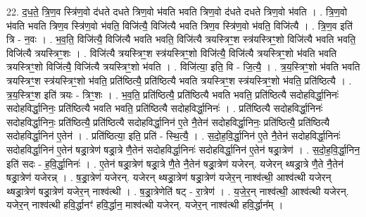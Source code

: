 \documentclass[17pt]{extarticle}
\begin{document}
22. द॒ध॒ते॒ त्रि॒ण॒व स्त्रि॑ण॒वो द॑धते दधते त्रिण॒वो भ॑वति भवति त्रिण॒वो द॑धते दधते त्रिण॒वो भ॑वति । . त्रि॒ण॒वो भ॑वति भवति त्रिण॒व स्त्रि॑ण॒वो भ॑वति॒ विजि॑त्यै॒ विजि॑त्यै भवति त्रिण॒व स्त्रि॑ण॒वो भ॑वति॒ विजि॑त्यै । . त्रि॒ण॒व इति॑ त्रि - न॒वः । . भ॒व॒ति॒ विजि॑त्यै॒ विजि॑त्यै भवति भवति॒ विजि॑त्यै त्रयस्त्रिꣳ॒॒श स्त्र॑यस्त्रिꣳ॒॒शो विजि॑त्यै भवति भवति॒ विजि॑त्यै त्रयस्त्रिꣳ॒॒शः । . विजि॑त्यै त्रयस्त्रिꣳ॒॒श स्त्र॑यस्त्रिꣳ॒॒शो विजि॑त्यै॒ विजि॑त्यै त्रयस्त्रिꣳ॒॒शो भ॑वति भवति त्रयस्त्रिꣳ॒॒शो विजि॑त्यै॒ विजि॑त्यै त्रयस्त्रिꣳ॒॒शो भ॑वति । . विजि॑त्या॒ इति॒ वि - जि॒त्यै॒ । . त्र॒य॒स्त्रिꣳ॒॒शो भ॑वति भवति त्रयस्त्रिꣳ॒॒श स्त्र॑यस्त्रिꣳ॒॒शो भ॑वति॒ प्रति॑ष्ठित्यै॒ प्रति॑ष्ठित्यै भवति त्रयस्त्रिꣳ॒॒श स्त्र॑यस्त्रिꣳ॒॒शो भ॑वति॒ प्रति॑ष्ठित्यै । . त्र॒य॒स्त्रिꣳ॒॒श इति॑ त्रयः - त्रिꣳ॒॒शः । . भ॒व॒ति॒ प्रति॑ष्ठित्यै॒ प्रति॑ष्ठित्यै भवति भवति॒ प्रति॑ष्ठित्यै सदोहविर्द्धा॒निनः॑ सदोहविर्द्धा॒निनः॒ प्रति॑ष्ठित्यै भवति भवति॒ प्रति॑ष्ठित्यै सदोहविर्द्धा॒निनः॑ । . प्रति॑ष्ठित्यै सदोहविर्द्धा॒निनः॑ सदोहविर्द्धा॒निनः॒ प्रति॑ष्ठित्यै॒ प्रति॑ष्ठित्यै सदोहविर्द्धा॒निन॑ 
ए॒ते नै॒तेन॑ सदोहविर्द्धा॒निनः॒ प्रति॑ष्ठित्यै॒ प्रति॑ष्ठित्यै सदोहविर्द्धा॒निन॑ ए॒तेन॑ । . प्रति॑ष्ठित्या॒ इति॒ प्रति॑ - स्थि॒त्यै॒ । . स॒दो॒ह॒वि॒र्द्धा॒निन॑ ए॒ते नै॒तेन॑ सदोहविर्द्धा॒निनः॑ सदोहविर्द्धा॒निन॑ ए॒तेन॑ षड्रा॒त्रेण॑ षड्रा॒त्रे णै॒तेन॑ सदोहविर्द्धा॒निनः॑ सदोहविर्द्धा॒निन॑ ए॒तेन॑ षड्रा॒त्रेण॑ । . स॒दो॒ह॒वि॒र्द्धा॒निन॒ इति॑ सदः - ह॒वि॒र्द्धा॒निनः॑ । . ए॒तेन॑ षड्रा॒त्रेण॑ षड्रा॒त्रे णै॒ते नै॒तेन॑ षड्रा॒त्रेण॑ यजेरन्. यजेरन् थ्षड्रा॒त्रे णै॒ते नै॒तेन॑ षड्रा॒त्रेण॑ यजेरन्न् । . ष॒ड्रा॒त्रेण॑ यजेरन्. यजेरन् थ्षड्रा॒त्रेण॑ षड्रा॒त्रेण॑ यजेर॒न् नाश्व॑त्थी॒ आश्व॑त्थी यजेरन् थ्षड्रा॒त्रेण॑ षड्रा॒त्रेण॑ यजेर॒न् नाश्व॑त्थी । . ष॒ड्रा॒त्रेणेति॑ षट् - रा॒त्रेण॑ । . य॒जे॒र॒न् नाश्व॑त्थी॒ आश्व॑त्थी यजेरन्. यजेर॒न् नाश्व॑त्थी हवि॒र्द्धानꣳ॑ हवि॒र्द्धान॒ माश्व॑त्थी यजेरन्. यजेर॒न् नाश्व॑त्थी हवि॒र्द्धान᳚म् । \newline
\end{document}
